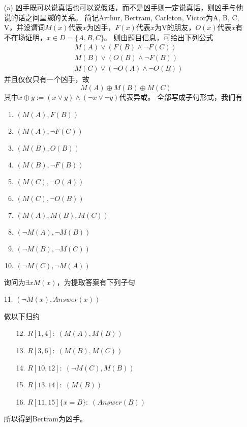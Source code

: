 \documentclass[a4paper, 11pt]{article}
\begin{document}
\begin{answer}
\begin{itemize}
    \item [(a)] 凶手既可以说真话也可以说假话，而不是凶手则一定说真话，则凶手与他说的话之间呈\emph{或}的关系。
    简记Arthur, Bertram, Carleton, Victor为A, B, C, V，并设谓词$M(x)$代表$x$为凶手，$F(x)$代表$x$为V的朋友，$O(x)$代表$x$有不在场证明，$x\in D=\{A,B,C\}$。
    则由题目信息，可给出下列公式
    \[\begin{aligned}
        & M(A)\lor(F(B)\land\lnot F(C))\\
        & M(B)\lor(O(B)\land\lnot F(B))\\
        & M(C)\lor(\lnot O(A)\land\lnot O(B))
    \end{aligned}\]
    并且仅仅只有一个凶手，故
    \[M(A)\oplus M(B)\oplus M(C)\]
    其中$x \oplus y:=(x\lor y)\land(\lnot x\lor\lnot y)$代表异或。
    全部写成子句形式，我们有
    \begin{enumerate}
        \item $(M(A),F(B))$
        \item $(M(A),\lnot F(C))$
        \item $(M(B),O(B))$
        \item $(M(B),\lnot F(B))$
        \item $(M(C),\lnot O(A))$
        \item $(M(C),\lnot O(B))$
        \item $(M(A), M(B), M(C))$
        \item $(\lnot M(A), \lnot M(B))$
        \item $(\lnot M(B), \lnot M(C))$
        \item $(\lnot M(C), \lnot M(A))$
    \end{enumerate}
    询问为$\exists xM(x)$，为提取答案有下列子句
    \begin{flushleft}
        11. $(\lnot M(x),Answer(x))$
    \end{flushleft}
    做以下归约
    \begin{enumerate}
        \item[12.] $R[1,4]:\;(M(A),M(B))$
        \item[13.] $R[3,6]:\;(M(B),M(C))$
        \item[14.] $R[10,12]:\;(\lnot M(C),M(B))$
        \item[15.] $R[13,14]:\;(M(B))$
        \item[16.] $R[11,15]\{x=B\}:\;(Answer(B))$
    \end{enumerate}
    所以得到Bertram为凶手。

\end{itemize}
\end{answer}
\end{document}
